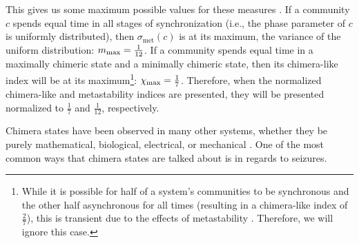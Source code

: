 This gives us some maximum possible values for these measures \cite{Shanahan2010}.
If a community $c$ spends equal time in all stages of synchronization (i.e., the phase parameter of $c$ is uniformly distributed), then $\sigma_{\text{met}}(c)$ is at its maximum, the variance of the uniform distribution: $m_{\text{max}} = \frac{1}{12}$.
If a community spends equal time in a maximally chimeric state and a minimally chimeric state, then its chimera-like index will be at its maximum\footnote{While it is possible for half of a system's communities to be synchronous and the other half asynchronous for all times (resulting in a chimera-like index of $\frac{2}{7}$), this is transient due to the effects of metastability \cite{Shanahan2010}.  Therefore, we will ignore this case.}: $\chi_{\text{max}} = \frac{1}{7}$.
Therefore, when the normalized chimera-like and metastability indices are presented, they will be presented normalized to $\frac{1}{7}$ and $\frac{1}{12}$, respectively.

Chimera states have been observed in many other systems, whether they be purely mathematical, biological, electrical, or mechanical \cite{Shanahan2010,Abrams2004,Andrzejak2016,Hizanidis2016,Kuramoto2002,Martens2013,Panaggio2015,Santos2015,Santos2017,Kruk2018,Xie2014}.
One of the most common ways that chimera states are talked about is in regards to seizures.

